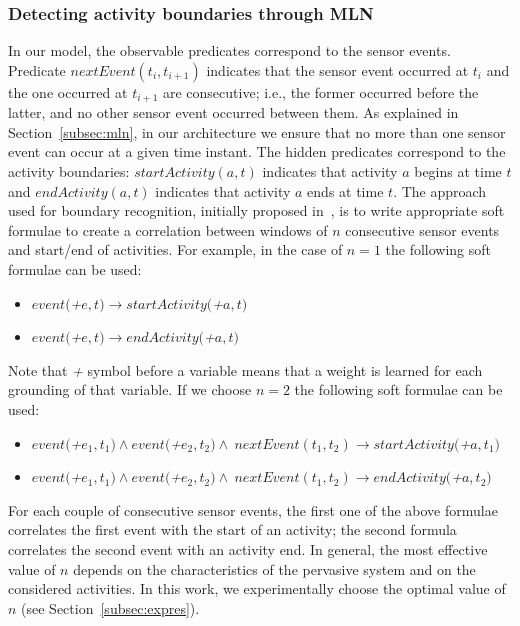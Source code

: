 \documentclass[10pt, conference, compsocconf]{IEEEtran}
\begin{document}
 \subsubsection{Detecting activity boundaries through MLN}
\label{subsubsec:detection}
In our model, the observable predicates correspond to the sensor events. 
Predicate $nextEvent(t_i,t_{i+1})$ indicates that the sensor event occurred at $t_i$ and the one occurred at $t_{i+1}$ are consecutive; i.e., the former occurred before the latter, and no other sensor event occurred between them. 
As explained in Section~\ref{subsec:mln}, in our architecture we ensure that no more than one sensor event can occur at a given time instant.
The hidden predicates correspond to the activity boundaries: $startActivity(a,t)$ indicates that activity $a$ begins at time $t$ and $endActivity(a,t)$ indicates that activity $a$ ends at time $t$. 
The approach used for boundary recognition, initially proposed in~\cite{Helaoui2011}, is to write appropriate soft formulae to create a correlation between windows of $n$ consecutive sensor events and start/end of activities. For example, in the case of $n=1$ the following soft formulae can be used:
\begin{itemize}
\item $event($\textit{+}$e,t) \rightarrow startActivity($\textit{+}$a,t)$
\item $event($\textit{+}$e,t) \rightarrow endActivity($\textit{+}$a,t)$
\end{itemize}
Note that \textit{+} symbol before a variable means that a weight is learned for each grounding of that variable.
If we choose $n=2$ the following soft formulae can be used:
\begin{itemize}
\item $event($\textit{+}$e_1,t_1) \land event($\textit{+}$e_2,t_2)  \land \ nextEvent(t_1,t_2)  \rightarrow startActivity($\textit{+}$a,t_1)$
\item $event($\textit{+}$e_1,t_1) \land event($\textit{+}$e_2,t_2) \land \ nextEvent(t_1,t_2)  \rightarrow endActivity($\textit{+}$a,t_2)$
\end{itemize}
For each couple of consecutive sensor events, the first one of the above formulae correlates the first event with the start of an activity; the second formula correlates the second event with an activity end.
In general, the most effective value of $n$ depends on the characteristics of the pervasive system and on the considered activities. In this work, we experimentally choose the optimal value of $n$ (see Section~\ref{subsec:expres}). 
\end{document}
